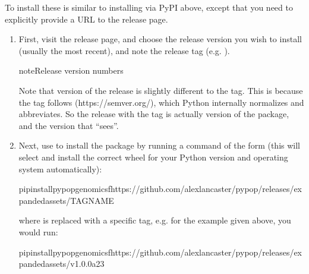 \documentclass[letterpaper,10pt,english,openany,oneside]{sphinxmanual}
\begin{document}
\sphinxAtStartPar
To install these is similar to installing via PyPI above, except that
you need to explicitly provide a URL to the release page.
\begin{enumerate}
%
\item {} 
\sphinxAtStartPar
First, visit the release page, and choose the release version you
wish to install (usually the most recent), and note the release tag
(e.g. ).

\begin{sphinxadmonition}{note}{Release version numbers}

\sphinxAtStartPar
Note that version of the release is slightly different to the
 tag.  This is because the  tag follows  (https://semver.org/), which Python internally
normalizes and abbreviates.  So the release with the  tag
 is actually version  of the
 package, and the version that  “sees”.
\end{sphinxadmonition}

\item {} 
\sphinxAtStartPar
Next, use  to install the package by running a command of
the form (this will select and install the correct wheel for your
Python version and operating system automatically):

\begin{sphinxVerbatim}[commandchars=\\\{\}]
pipinstallpypop\PYGZhy{}genomics\PYGZhy{}fhttps://github.com/alexlancaster/pypop/releases/expanded\PYGZus{}assets/\PYGZlt{}TAG\PYGZus{}NAME\PYGZgt{}
\end{sphinxVerbatim}

\sphinxAtStartPar
where  is replaced with a specific tag, e.g. for the example given above, you would run:

\begin{sphinxVerbatim}[commandchars=\\\{\}]
pipinstallpypop\PYGZhy{}genomics\PYGZhy{}fhttps://github.com/alexlancaster/pypop/releases/expanded\PYGZus{}assets/v1.0.0\PYGZhy{}a23
\end{sphinxVerbatim}


\end{enumerate}
\end{document}
